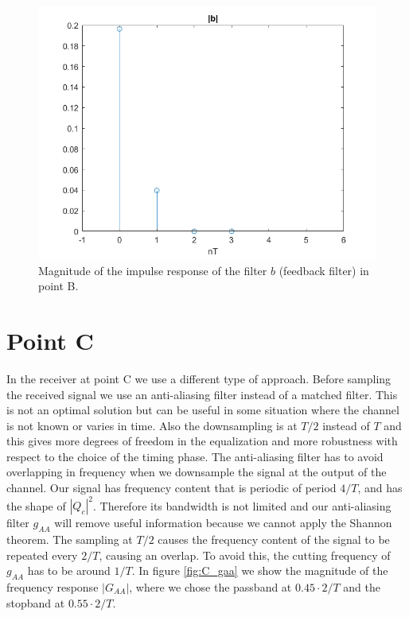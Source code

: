 \documentclass[a4paper,11.5pt]{article}
\begin{document}
\begin{figure}[H]
	\begin{center}   
		\includegraphics[width=\textwidth]{figs/B_b.png} 
		\caption{Magnitude of the impulse response of the filter $b$ (feedback filter) in point B.}
		\label{fig:B_b}
	\end{center}
\end{figure}


\section*{Point C}

In the receiver at point C we use a different type of approach. Before sampling the received signal we use an anti-aliasing filter instead of a matched filter. This is not an optimal solution but can be useful in some situation where the channel is not known or varies in time. Also the downsampling is at $T/2$ instead of $T$ and this gives more degrees of freedom in the equalization and more robustness with respect to the choice of the timing phase. The anti-aliasing filter has to avoid overlapping in frequency when we downsample the signal at the output of the channel. Our signal has frequency content that is periodic of period $4/T$, and has the shape of $|Q_c|^2$. Therefore its bandwidth is not limited and our anti-aliasing filter $g_{AA}$ will remove useful information because we cannot apply the Shannon theorem. The sampling at $T/2$ causes the frequency content of the signal to be repeated every $2/T$, causing an overlap. To avoid this, the cutting frequency of $g_{AA}$ has to be around $1/T$. In figure \ref{fig:C_gaa} we show the magnitude of the frequency response $|G_{AA}|$, where we chose the passband at $0.45 \cdot 2/T$ and the stopband at $0.55\cdot 2/T$.
\end{document}
